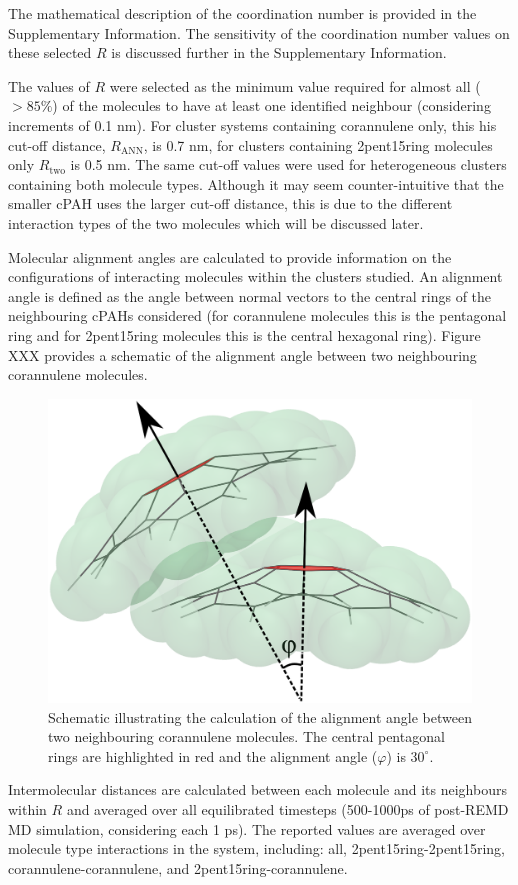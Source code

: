  
The mathematical description of the coordination number is provided in the Supplementary Information.
The sensitivity of the coordination number values on these selected $R$ is discussed further in the Supplementary Information.


The values of $R$ were selected as the minimum value required for almost all ($>85\%$) of the molecules to have at least one identified neighbour (considering increments of 0.1 nm).  For cluster systems containing corannulene only, this his cut-off distance, $R_{\text{ANN}}$, is 0.7 nm, for clusters containing 2pent15ring molecules only $R_{\text{two}}$ is 0.5 nm. The same cut-off values were used for heterogeneous clusters containing both molecule types.
Although it may seem counter-intuitive that the smaller cPAH uses the larger cut-off distance, this is due to the different interaction types of the two molecules which will be discussed later.

Molecular alignment angles are calculated to provide information on the configurations of interacting molecules within the clusters studied.  An alignment angle is defined as the angle between normal vectors to the central rings of the neighbouring cPAHs considered (for corannulene molecules this is the pentagonal ring and for 2pent15ring molecules this is the central hexagonal ring).  Figure XXX provides a schematic of the alignment angle between two neighbouring corannulene molecules.
%
\begin{figure}[!tbh]
\centering
\includegraphics[width=0.25\linewidth]{Figures/alignment_angle_schematic.eps}
\caption{Schematic illustrating the calculation of the alignment angle between two neighbouring corannulene molecules. The central pentagonal rings are highlighted in red and the alignment angle ($\varphi$) is $30^{\circ}$.}
\label{fig:alignmentangle_schematic}
\end{figure}
 

Intermolecular distances are calculated between each molecule and its neighbours within $R$ and averaged over all equilibrated timesteps (500-1000ps of post-REMD MD simulation, considering each 1 ps).  The reported values are averaged over molecule type interactions in the system, including: all, 2pent15ring-2pent15ring, corannulene-corannulene, and 2pent15ring-corannulene.

